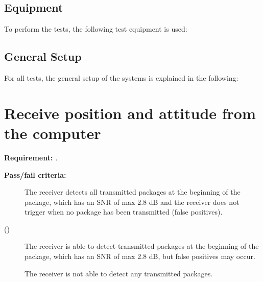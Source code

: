 \subsection*{Equipment}
To perform the tests, the following test equipment is used:
\begin{table}[H] \centering
{}
\caption{Test equipment used for the acceptance test.}
\label{tab:test_equipment}
\end{table}

\subsection*{General Setup}\label{sec:General_setup}
For all tests, the general setup of the systems is explained in the following: 


\section{Receive position and attitude from the computer}
\textbf{Requirement: }
\textit{.}

\textbf{Pass/fail criteria:}
	\begin{description}
	\item[  ] The receiver detects all transmitted packages at the beginning of the package, which has an SNR of max 2.8 dB and the receiver does not trigger when no package has been transmitted (false positives).
	\item[()]The receiver is able to detect transmitted packages at the beginning of the package, which has an SNR of max 2.8 dB, but false positives may occur.
	\item[  \phantom{)}]The receiver is not able to detect any transmitted packages.
	\end{description}

